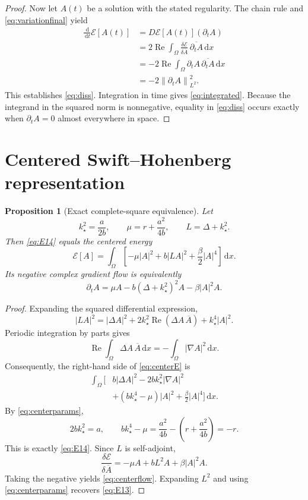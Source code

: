 \documentclass[11pt]{article}
\numberwithin{equation}{section}
\newtheorem{proposition}{Proposition}
\newcommand{\E}{\mathcal E}
\newcommand{\Om}{\Omega}
\newcommand{\dd}{\,\mathrm d}
\newcommand{\norm}[1]{\left\lVert #1\right\rVert}
\begin{document}
\begin{proof}
Now let $A(t)$ be a solution with the stated regularity.
The chain rule and \eqref{eq:variationfinal} yield
\begin{align*}
\frac{\dd}{\dd t}\E[A(t)]
&=D\E[A(t)](\partial_t A)\\
&=2\operatorname{Re}\int_\Om
\frac{\delta\E}{\delta\overline A}
\,\overline{\partial_t A}\dd x\\
&=-2\operatorname{Re}\int_\Om
\partial_t A\,\overline{\partial_t A}\dd x\\
&=-2\norm{\partial_t A}_{L^2}^2.
\end{align*}
This establishes \eqref{eq:diss}.
Integration in time gives \eqref{eq:integrated}.
Because the integrand in the squared norm is nonnegative,
equality in \eqref{eq:diss} occurs exactly when
$\partial_t A=0$ almost everywhere in space.
\end{proof}

\section{Centered Swift--Hohenberg representation}

\begin{proposition}[Exact complete-square equivalence]
Let
\begin{equation}\label{eq:centerparams}
k_\star^2=\frac{a}{2b},
\qquad
\mu=r+\frac{a^2}{4b},
\qquad
L=\Delta+k_\star^2.
\end{equation}
Then \eqref{eq:E14} equals the centered energy
\begin{equation}\label{eq:centerE}
\boxed{\displaystyle
\E[A]=\int_\Om\left[
-\mu|A|^2+b|LA|^2+\frac{\beta}{2}|A|^4
\right]\dd x.}
\end{equation}
Its negative complex gradient flow is equivalently
\begin{equation}\label{eq:centerflow}
\boxed{\displaystyle
\partial_tA=\mu A-b(\Delta+k_\star^2)^2A
-\beta|A|^2A.}
\end{equation}
\end{proposition}

\begin{proof}
Expanding the squared differential expression,
\[
|LA|^2=|\Delta A|^2+
2k_\star^2\operatorname{Re}(\Delta A\,\overline A)
+k_\star^4|A|^2.
\]
Periodic integration by parts gives
\[
\operatorname{Re}\int_\Om
\Delta A\,\overline A\dd x
=-\int_\Om|\nabla A|^2\dd x.
\]
Consequently, the right-hand side of \eqref{eq:centerE}
is
\begin{align*}
\int_\Om\bigl[
&b|\Delta A|^2-2bk_\star^2|\nabla A|^2\\
&+(bk_\star^4-\mu)|A|^2
+\tfrac{\beta}{2}|A|^4\bigr]\dd x.
\end{align*}
By \eqref{eq:centerparams},
\[
2bk_\star^2=a,
\qquad
bk_\star^4-\mu
=\frac{a^2}{4b}
-\left(r+\frac{a^2}{4b}\right)=-r.
\]
This is exactly \eqref{eq:E14}. Since $L$ is self-adjoint,
\[
\frac{\delta\E}{\delta\overline A}
=-\mu A+bL^2A+\beta|A|^2A.
\]
Taking the negative yields \eqref{eq:centerflow}.
Expanding $L^2$ and using \eqref{eq:centerparams}
recovers \eqref{eq:E13}.
\end{proof}
\end{document}
